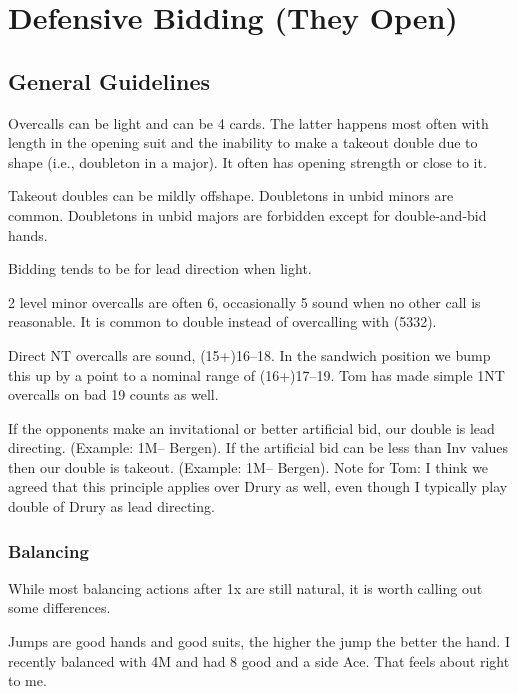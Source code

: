 \documentclass[tom-ari]{subfile}
\begin{document}
	
	\chapter{Defensive Bidding (They Open)}
	
	\section{General Guidelines}
	
	Overcalls can be light and can be 4 cards. The latter happens most often with length in the opening suit and the inability to make a takeout double due to shape (i.e., doubleton in a major). It often has opening strength or close to it.
	
	Takeout doubles can be mildly offshape. Doubletons in unbid minors are common. Doubletons in unbid majors are forbidden except for double-and-bid hands.
	
	Bidding tends to be for lead direction when light.
	
	2 level minor overcalls are often 6, occasionally 5 sound when no other call is reasonable. It is common to double instead of overcalling with \shape(5332).
	
	Direct NT overcalls are sound, (15+)16--18. In the sandwich position we bump this up by a point to a nominal range of (16+)17--19. Tom has made simple 1NT overcalls on bad 19 counts as well.
	
	If the opponents make an invitational or better artificial bid, our double is lead directing. (Example: 1M-- Bergen).  If the artificial bid can be less than Inv values then our double is takeout.  (Example: 1M-- Bergen). Note for Tom: I think we agreed that this principle applies over Drury as well, even though I typically play double of Drury as lead directing. 
	
	\subsection{Balancing}
	
	While most balancing actions after 1x are still natural, it is worth calling out some differences.
	
	Jumps are good hands and good suits, the higher the jump the better the hand. I recently balanced with 4M and had 8 good and a side Ace. That feels about right to me.
	
\end{document}

